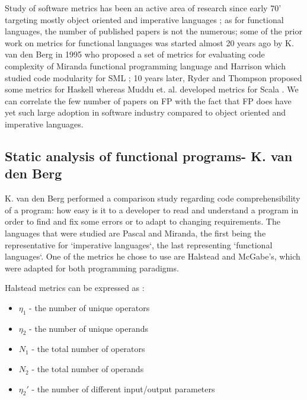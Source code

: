 \documentclass{article}
\begin{document}
Study of software metrics has been an active area of research since early 70' targeting mostly object oriented and imperative languages \cite{RyderT05:TFP_2005_Intellect}; as for functional languages, the number of published papers is not the numerous; some of the prior work on metrics for functional languages was started almost 20 years ago by K. van den Berg in 1995 \cite{DBLP:journals/infsof/BergB95} who proposed a set of metrics for evaluating code complexity of Miranda functional programming language and Harrison which studied code modularity for SML \cite{eps250597}; 10 years later, Ryder and Thompson proposed some metrics for Haskell \cite{RyderT05:TFP_2005_Intellect} whereas  Muddu et. al. developed metrics for Scala \cite{DBLP:conf/icse/MudduABP13}. We can correlate the few number of papers on FP with the fact that FP does have yet such large adoption in software industry compared to object oriented and imperative languages.  \par

\subsection{Static analysis of functional programs- K. van den Berg}
K. van den Berg performed a comparison study regarding code comprehensibility of a program: how easy is it to a developer to read and understand a program in order to find and fix some errors or to adapt to changing requirements. The languages that were studied are Pascal and Miranda, the first being the representative for `imperative languages`, the last representing `functional languages`. One of the metrics he chose to use are Halstead and McGabe's, which were adapted for both programming paradigms. \par

Halstead metrics can be expressed as :

\begin{itemize}
\item $\eta_1$ - the number of unique operators \par
\item $\eta_2$ - the number of unique operands \par
\item $N_1$ - the total number of operators \par
\item$N_2$ - the total number of operands \par
\item$\eta_2'$ - the number of different input/output parameters \par
\end{itemize}
\end{document}

